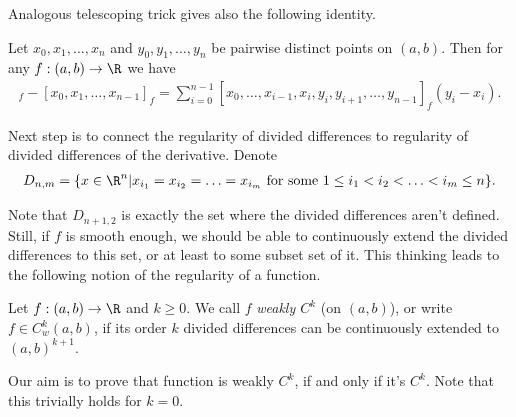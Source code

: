 Analogous telescoping trick gives also the following identity.
\begin{prop}\label{total_derivative}
	Let $x_{0}, x_{1}, \ldots, x_{n}$ and $y_{0}, y_{1}, \ldots, y_{n}$ be pairwise distinct points on $(a, b)$. Then for any $f : (a, b) \to \R$ we have
	\begin{align}
		[y_{0}, y_{1}, \ldots, y_{n - 1}]_{f} - [x_{0}, x_{1}, \ldots, x_{n - 1}]_{f} = \sum_{i = 0}^{n - 1} [x_{0}, \ldots, x_{i - 1}, x_{i}, y_{i}, y_{i + 1}, \ldots, y_{n - 1}]_{f} (y_{i} - x_{i}).
	\end{align}
\end{prop}

Next step is to connect the regularity of divided differences to regularity of divided differences of the derivative. Denote
\begin{align*}
	D_{n, m} = \{x \in \R^{n} | x_{i_{1}} = x_{i_{2}} = \ldots = x_{i_{m}} \text{ for some $1 \leq i_{1} < i_{2} < \ldots < i_{m} \leq n$} \}.
\end{align*}

Note that $D_{n + 1, 2}$ is exactly the set where the divided differences aren't defined. Still, if $f$ is smooth enough, we should be able to continuously extend the divided differences to this set, or at least to some subset set of it. This thinking leads to the following notion of the regularity of a function.

\begin{maar}
	Let $f : (a, b) \to \R$ and $k \geq 0$. We call $f$ \textit{weakly $C^{k}$} (on $(a, b)$), or write $f \in C_{w}^{k}(a, b)$, if its order $k$ divided differences can be continuously extended to $(a, b)^{k + 1}$.
\end{maar}

Our aim is to prove that function is weakly $C^{k}$, if and only if it's $C^{k}$. Note that this trivially holds for $k = 0$.

